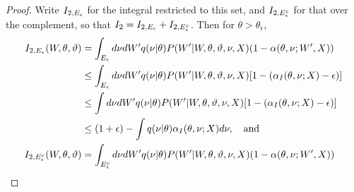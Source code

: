 \begin{proof}
{  Write $I_{2,E_{\epsilon}}$ for the integral restricted to this set, 
  and $I_{2,E_{\epsilon}^c}$ for that over the complement, so that
 $I_{2}= I_{2,E_{\epsilon}}+I_{2,E_{\epsilon}^c}$.
 Then for $\theta > \theta_\epsilon$,}
\begin{align*}
I_{2,\E_{\epsilon}}(W, \theta, \vartheta) &= \int_{\E_{\epsilon}} d\ptheta  dW'q(\ptheta | \theta)P(W' | W, \theta, \vartheta, \ptheta, X)(1 - \alpha(\theta, \ptheta ; W', X)) \\
&\le \int_{\E_\epsilon}d\ptheta dW' q(\ptheta | \theta)
  P(W' | W, \theta, \vartheta, \ptheta, X)  [ 1 - (\alpha_I(\theta, \ptheta ; X)-\epsilon)] \\
&\le   \int d\ptheta dW'  q(\ptheta | \theta)
  P(W' | W, \theta, \vartheta, \ptheta, X)
  [ 1 - (\alpha_I(\theta, \ptheta ; X)-\epsilon)] \\
  &\le (1+\epsilon)  - \int  q(\ptheta | \theta) \alpha_I(\theta, \ptheta ; X) d\ptheta, \quad \text{and}  \\
  I_{2,\E_{\epsilon}^c}(W, \theta, \vartheta)  &= \int_{\E^c_{\epsilon}} d\ptheta  dW'q(\ptheta | \theta)P(W' | W, \theta, \vartheta, \ptheta, X)(1 - \alpha(\theta, \ptheta ; W', X)) \\

\end{align*}
\end{proof}
